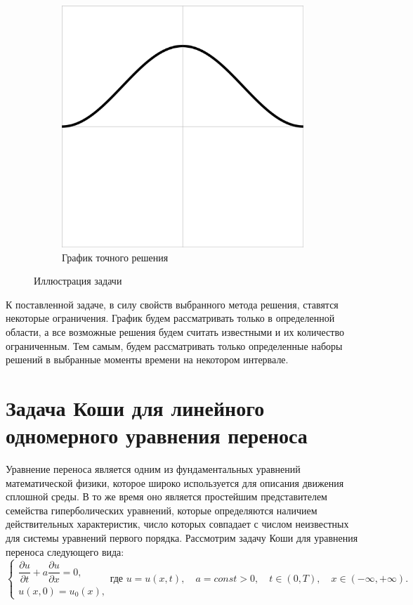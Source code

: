 \documentclass[12pt, a4paper]{article}
\begin{document}
\begin{figure}[h]
\begin{subfigure}[b]{0.45\textwidth}
		\includegraphics[width=\textwidth]{test4}
		\caption{График точного решения}
		\label{image2}
	\end{subfigure}
	\caption{Иллюстрация задачи}
\end{figure}

К поставленной задаче, в силу свойств выбранного метода решения, ставятся некоторые ограничения. График будем рассматривать только в определенной области, а все возможные решения будем считать известными и их количество ограниченным. Тем самым, будем рассматривать только определенные наборы решений в выбранные моменты времени на некотором интервале.

\section{Задача Коши для линейного одномерного уравнения переноса}
Уравнение переноса является одним из фундаментальных уравнений математической физики, которое широко используется для описания движения сплошной среды. В то же время оно является простейшим представителем семейства гиперболических уравнений, которые определяются наличием действительных характеристик, число которых совпадает с числом неизвестных для системы уравнений первого порядка. Рассмотрим задачу Коши для уравнения переноса следующего вида:
\begin{equation}
	\begin{cases}
		\dfrac{\partial u}{\partial t} + a\dfrac{\partial u}{\partial x} = 0, \\
		u(x, 0) = u_0(x),
	\end{cases} 
	\text{где } u = u(x, t), \quad a = const > 0, \quad t \in (0, T), \quad x \in (-\infty, +\infty) .
\end{equation}
\end{document}
